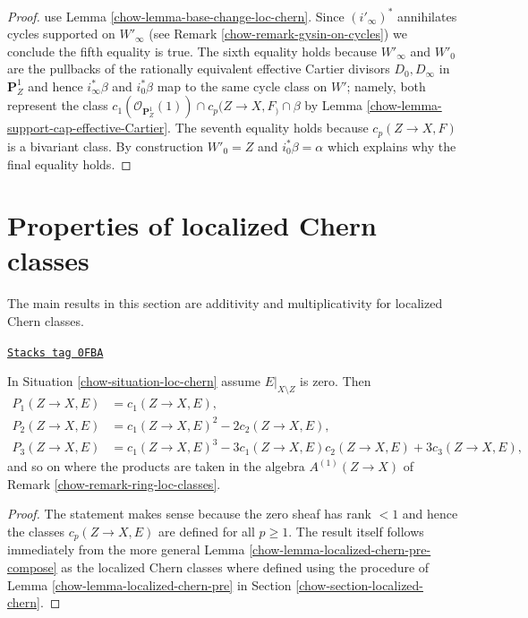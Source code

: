 \begin{proof}
use Lemma \ref{chow-lemma-base-change-loc-chern}.
Since $(i'_\infty)^*$ annihilates cycles supported on $W'_\infty$
(see Remark \ref{chow-remark-gysin-on-cycles}) we conclude the fifth equality
is true. The sixth equality holds because $W'_\infty$ and $W'_0$
are the pullbacks of the rationally equivalent effective Cartier divisors
$D_0, D_\infty$ in $\mathbf{P}^1_Z$ and hence $i_\infty^*\beta$ and
$i_0^*\beta$ map to the same cycle class on $W'$; namely, both
represent the class
$c_1(\mathcal{O}_{\mathbf{P}^1_Z}(1)) \cap c_p(Z \to X, F_) \cap \beta$ by
Lemma \ref{chow-lemma-support-cap-effective-Cartier}.
The seventh equality holds because $c_p(Z \to X, F)$ is
a bivariant class. By construction $W'_0 = Z$ and $i_0^*\beta = \alpha$
which explains why the final equality holds.
\end{proof}

\section{Properties of localized Chern classes}
\label{chow-section-properties-loc-chern}
The main results in this section are additivity and multiplicativity
for localized Chern classes.

\begin{lemma}
\label{chow-lemma-loc-chern-character}
\href{https://stacks.math.columbia.edu/tag/0FBA}{\texttt{Stacks tag 0FBA}}

In Situation \ref{chow-situation-loc-chern} assume $E|_{X \setminus Z}$ is zero.
Then
\begin{align*}
P_1(Z \to X, E) & = c_1(Z \to X, E), \\
P_2(Z \to X, E) & = c_1(Z \to X, E)^2 - 2c_2(Z \to X, E), \\
P_3(Z \to X, E) & = c_1(Z \to X, E)^3 - 3c_1(Z \to X, E)c_2(Z \to X, E)
+ 3c_3(Z \to X, E),
\end{align*}
and so on where the products are taken in the algebra $A^{(1)}(Z \to X)$
of Remark \ref{chow-remark-ring-loc-classes}.
\end{lemma}

\begin{proof}

The statement makes sense because the zero sheaf has rank $< 1$ and
hence the classes $c_p(Z \to X, E)$ are defined for all $p \geq 1$.
The result itself follows immediately from the more general
Lemma \ref{chow-lemma-localized-chern-pre-compose} as the localized Chern
classes where defined using the procedure of
Lemma \ref{chow-lemma-localized-chern-pre}
in Section \ref{chow-section-localized-chern}.
\end{proof}

